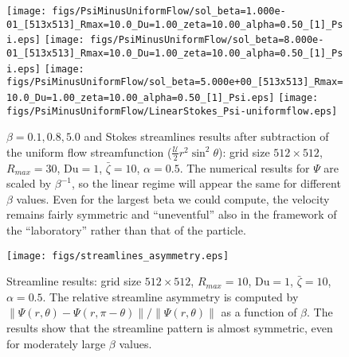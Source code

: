 \documentclass[MSc,beforeExam]{iitcsthesis}
\newcommand\Du{\text{Du}}
\newcommand\cU{\mathscr{U}}
\begin{document}
\begin{figure}
    \begin{center}
    \texttt{[image: figs/PsiMinusUniformFlow/sol\_beta=1.000e-01\_[513x513]\_Rmax=10.0\_Du=1.00\_zeta=10.00\_alpha=0.50\_[1]\_Psi.eps]}
    \texttt{[image: figs/PsiMinusUniformFlow/sol\_beta=8.000e-01\_[513x513]\_Rmax=10.0\_Du=1.00\_zeta=10.00\_alpha=0.50\_[1]\_Psi.eps]}
    \texttt{[image: figs/PsiMinusUniformFlow/sol\_beta=5.000e+00\_[513x513]\_Rmax=10.0\_Du=1.00\_zeta=10.00\_alpha=0.50\_[1]\_Psi.eps]}
    \texttt{[image: figs/PsiMinusUniformFlow/LinearStokes\_Psi-uniformflow.eps]}
        \caption[Streamfunction results]
        {$\beta = 0.1, 0.8, 5.0$ and Stokes streamlines results after subtraction of the uniform
        flow streamfunction ($\frac{\cU}{2}r^2 \sin^2\theta$): grid size $512 \times 512$, 
        $R_{max} = 30$, $\Du = 1$, $\bar\zeta = 10$, $\alpha = 0.5$.
        The numerical results for $\Psi$ are scaled by $\beta^{-1}$, so the linear regime
        will appear the same for different $\beta$ values.
        Even for the largest beta we could compute, the velocity remains fairly symmetric and 		
        ``uneventful'' also in the framework of the ``laboratory'' rather than that of the particle.}
	    \label{fig:LargeBeta_PsiMinusUniformFlow}	    
    \end{center}
\end{figure}

\begin{figure}
    \begin{center}
    \texttt{[image: figs/streamlines\_asymmetry.eps]}
        \caption[Streamfunction asymmetry]
        {Streamline results: grid size $512 \times 512$, 
        $R_{max} = 10$, $\Du = 1$, $\bar\zeta = 10$, $\alpha = 0.5$.
        The relative streamline asymmetry is computed by 
        $\|\Psi(r, \theta) - \Psi(r, \pi-\theta)\|/\|\Psi(r, \theta)\|$
        as a function of $\beta$. The results show that the streamline pattern is almost 
        symmetric, even for moderately large $\beta$ values.}
	    \label{fig:LargeBeta_PsiAsymm}	    
    \end{center}
\end{figure}
\end{document}
